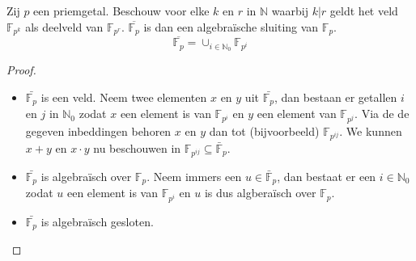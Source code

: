 \documentclass[main.tex]{subfiles}
\begin{document}
\begin{pr}
  Zij $p$ een priemgetal.
  Beschouw voor elke $k$ en $r$ in $\mathbb{N}$ waarbij $k|r$ geldt het veld $\mathbb{F}_{p^{k}}$ als deelveld van $\mathbb{F}_{p^{r}}$.
  $\overline{\mathbb{F}_{p}}$ is dan een algebra\"ische sluiting van $\mathbb{F}_{p}$.
  \[ \overline{\mathbb{F}_{p}} = \cup_{i\in \mathbb{N}_{0}}\mathbb{F}_{p^{i}} \]

  \begin{proof}
    \begin{itemize}
    \item $\bar{\mathbb{F}_{p}}$ is een veld.
      Neem twee elementen $x$ en $y$ uit $\bar{\mathbb{F}_{p}}$, dan bestaan er getallen $i$ en $j$ in $\mathbb{N}_{0}$ zodat $x$ een element is van $\mathbb{F}_{p^{i}}$ en $y$ een element van $\mathbb{F}_{p^{j}}$.
      Via de de gegeven inbeddingen behoren $x$ en $y$ dan tot (bijvoorbeeld) $\mathbb{F}_{p^{ij}}$.
      We kunnen $x+y$ en $x\cdot y$ nu beschouwen in $\mathbb{F}_{p^{ij}} \subseteq \bar{\mathbb{F}}_{p}$.
    \item $\bar{\mathbb{F}_{p}}$ is algebra\"isch over $\mathbb{F}_{p}$.
      Neem immers een $u\in \bar{\mathbb{F}}_{p}$, dan bestaat er een $i\in \mathbb{N}_{0}$ zodat $u$ een element is van $\mathbb{F}_{p^{i}}$ en $u$ is dus algbera\"isch over $\mathbb{F}_{p}$.
    \item $\bar{\mathbb{F}_{p}}$ is algebra\"isch gesloten.
    \end{itemize}
  \end{proof}
\end{pr}

\end{document}
